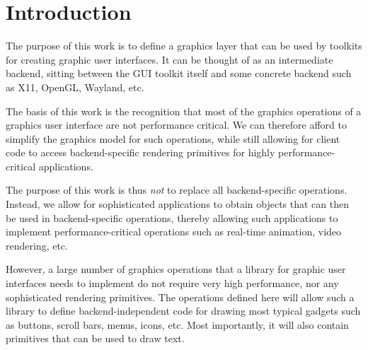 \chapter{Introduction}
%

The purpose of this work is to define a graphics layer that can be
used by \commonlisp{} toolkits for creating graphic user interfaces.
It can be thought of as an intermediate backend, sitting between the
GUI toolkit itself and some concrete backend such as X11, OpenGL,
Wayland, etc.

The basis of this work is the recognition that most of the graphics
operations of a graphics user interface are not performance critical.
We can therefore afford to simplify the graphics model for such
operations, while still allowing for client code to access
backend-specific rendering primitives for highly performance-critical
applications.

The purpose of this work is thus \emph{not} to replace all
backend-specific operations.  Instead, we allow for sophisticated
applications to obtain objects that can then be used in
backend-specific operations, thereby allowing such applications to
implement performance-critical operations such as real-time animation,
video rendering, etc.

However, a large number of graphics operations that a library for
graphic user interfaces needs to implement do not require very high
performance, nor any sophisticated rendering primitives.  The
operations defined here will allow such a library to define
backend-independent code for drawing most typical gadgets such as
buttons, scroll bars, menus, icons, etc.  Most importantly, it will
also contain primitives that can be used to draw text.

